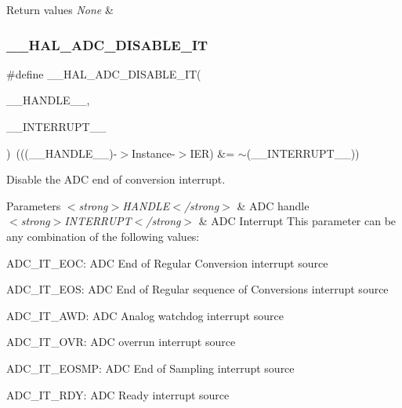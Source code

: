 \begin{DoxyRetVals}{Return values}
{\em None} & \\
\hline
\end{DoxyRetVals}
\mbox{\label{group___a_d_c___exported___macros_gadcec48b44a2133effd20f41ab227edb9}} 
\subsubsection{\texorpdfstring{\+\_\+\+\_\+\+H\+A\+L\+\_\+\+A\+D\+C\+\_\+\+D\+I\+S\+A\+B\+L\+E\+\_\+\+IT}{\_\_HAL\_ADC\_DISABLE\_IT}}
{\footnotesize\ttfamily \#define \+\_\+\+\_\+\+H\+A\+L\+\_\+\+A\+D\+C\+\_\+\+D\+I\+S\+A\+B\+L\+E\+\_\+\+IT(\begin{DoxyParamCaption}\item[{}]{\+\_\+\+\_\+\+H\+A\+N\+D\+L\+E\+\_\+\+\_\+,  }\item[{}]{\+\_\+\+\_\+\+I\+N\+T\+E\+R\+R\+U\+P\+T\+\_\+\+\_\+ }\end{DoxyParamCaption})~(((\+\_\+\+\_\+\+H\+A\+N\+D\+L\+E\+\_\+\+\_\+)-\/$>$Instance-\/$>$I\+ER) \&= $\sim$(\+\_\+\+\_\+\+I\+N\+T\+E\+R\+R\+U\+P\+T\+\_\+\+\_\+))}



Disable the A\+DC end of conversion interrupt. 


\begin{DoxyParams}{Parameters}
{\em $<$strong$>$\+H\+A\+N\+D\+L\+E$<$/strong$>$} & A\+DC handle \\
\hline
{\em $<$strong$>$\+I\+N\+T\+E\+R\+R\+U\+P\+T$<$/strong$>$} & A\+DC Interrupt This parameter can be any combination of the following values\+: \begin{DoxyItemize}
\item A\+D\+C\+\_\+\+I\+T\+\_\+\+E\+OC\+: A\+DC End of Regular Conversion interrupt source \item A\+D\+C\+\_\+\+I\+T\+\_\+\+E\+OS\+: A\+DC End of Regular sequence of Conversions interrupt source \item A\+D\+C\+\_\+\+I\+T\+\_\+\+A\+WD\+: A\+DC Analog watchdog interrupt source \item A\+D\+C\+\_\+\+I\+T\+\_\+\+O\+VR\+: A\+DC overrun interrupt source \item A\+D\+C\+\_\+\+I\+T\+\_\+\+E\+O\+S\+MP\+: A\+DC End of Sampling interrupt source \item A\+D\+C\+\_\+\+I\+T\+\_\+\+R\+DY\+: A\+DC Ready interrupt source \end{DoxyItemize}
\\
\hline
\end{DoxyParams}

